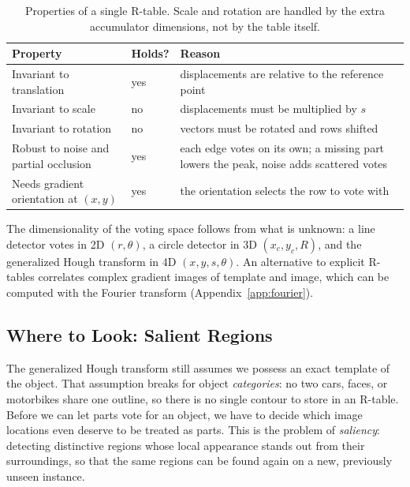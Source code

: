 \begin{table}[ht]
  \centering
  \begin{tabular}{@{}p{4.2cm}p{1.6cm}p{7.2cm}@{}}
    \toprule
    Property & Holds? & Reason \\
    \midrule
    Invariant to translation & yes & displacements are relative to the
      reference point \\
    Invariant to scale & no & displacements must be multiplied by $s$ \\
    Invariant to rotation & no & vectors must be rotated and rows shifted \\
    Robust to noise and partial occlusion & yes & each edge votes on its own; a
      missing part lowers the peak, noise adds scattered votes \\
    Needs gradient orientation at $(x,y)$ & yes & the orientation selects the
      row to vote with \\
    \bottomrule
  \end{tabular}
  \caption{Properties of a single R-table. Scale and rotation are handled by the
  extra accumulator dimensions, not by the table itself.}
  \label{tab:rtable-props}
\end{table}

\noindent
The dimensionality of the voting space follows from what is unknown: a line
detector votes in 2D $(r,\theta)$, a circle detector in 3D $(x_c,y_c,R)$, and the
generalized Hough transform in 4D $(x,y,s,\theta)$. An alternative to explicit
R-tables correlates complex gradient images of template and image, which can be
computed with the Fourier transform (Appendix~\ref{app:fourier}).

\subsection{Where to Look: Salient Regions}

The generalized Hough transform still assumes we possess an exact template of the
object. That assumption breaks for object \emph{categories}: no two cars, faces,
or motorbikes share one outline, so there is no single contour to store in an
R-table. Before we can let parts vote for an object, we have to decide which image
locations even deserve to be treated as parts. This is the problem of
\emph{saliency}: detecting distinctive regions whose local appearance stands out
from their surroundings, so that the same regions can be found again on a new,
previously unseen instance.

